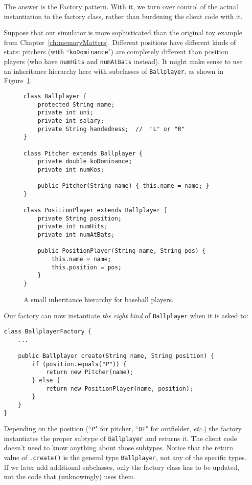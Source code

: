 The answer is the Factory pattern. With it, we turn over control of the actual
instantiation to the factory class, rather than burdening the client code with
it.

Suppose that our simulator is more sophisticated than the original toy example
from Chapter~\ref{ch:memoryMatters}. Different positions have different kinds
of stats: pitchers (with ``\texttt{koDominance}") are completely different
than position players (who have \texttt{numHits} and \texttt{numAtBats}
instead). It might make sense to use an inheritance hierarchy here with
subclasses of \texttt{Ballplayer}, as shown in
Figure~\ref{ballplayerInheritance}.

\begin{figure}[ht]
\begin{Verbatim}[fontsize=\small,samepage=true,frame=single]
class Ballplayer {
    protected String name;
    private int uni;
    private int salary;
    private String handedness;  //  "L" or "R"
}

class Pitcher extends Ballplayer {
    private double koDominance;
    private int numKos;

    public Pitcher(String name) { this.name = name; }
}

class PositionPlayer extends Ballplayer {
    private String position;
    private int numHits;
    private int numAtBats;

    public PositionPlayer(String name, String pos) {
        this.name = name;
        this.position = pos;
    }
}
\end{Verbatim}
\caption{A small inheritance hierarchy for baseball players.}
\label{ballplayerInheritance}
\end{figure}

Our factory can now instantiate \textit{the right kind} of \texttt{Ballplayer}
when it is asked to:

\begin{Verbatim}[fontsize=\small,samepage=true,frame=single]
class BallplayerFactory {
    ...

    public Ballplayer create(String name, String position) {
        if (position.equals("P")) {
            return new Pitcher(name);
        } else {
            return new PositionPlayer(name, position);
        }
    }
}
\end{Verbatim}

Depending on the position (``\texttt{P}" for pitcher, ``\texttt{OF}" for
outfielder, \textit{etc.}) the factory instantiates the proper subtype of
\texttt{Ballplayer} and returns it. The client code doesn't need to know
anything about those subtypes. Notice that the return value of
\texttt{.create()} is the general type \texttt{Ballplayer}, not any of the
specific types. If we later add additional subclasses, only the factory class
has to be updated, not the code that (unknowingly) uses them.

